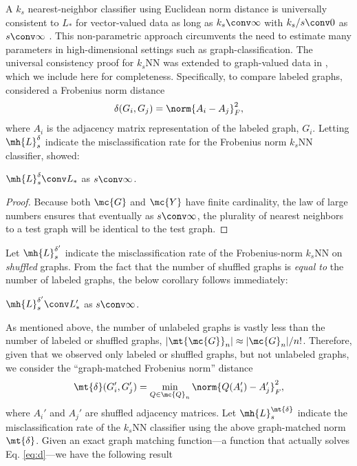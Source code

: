 \documentclass[10pt,journal,cspaper,compsoc]{IEEEtran}
\begin{document}
A $k_s$ nearest-neighbor classifier 
using Euclidean norm distance
is universally consistent to $L_*$ for vector-valued data 
as long as $k_s \conv \infty$ with $k_s/s \conv 0$ as $s \conv \infty$ \cite{Stone1977}. This non-parametric approach circumvents the need to estimate many parameters in high-dimensional settings such as graph-classification. The universal consistency proof for $k_s$NN was extended to graph-valued data in \cite{VP11_super}, which we include here for completeness.   Specifically, to compare labeled graphs, \cite{VP11_super} considered a Frobenius norm distance
\begin{align}
	\delta(G_i,G_j)=\norm{A_i-A_j}_F^2,
\end{align}
where $A_i$ is the adjacency matrix representation of the labeled graph, $G_i$.  Letting $\mh{L}^{\delta}_s$ indicate the misclassification rate for the Frobenius norm $k_s$NN classifier, \cite{VP11_super} showed:
\begin{thm} \label{thm:5}
	$\mh{L}^{\delta}_s \conv L_*$ as $s \conv \infty$.
\end{thm}
\begin{proof}
Because both $\mc{G}$ and $\mc{Y}$ have finite cardinality, the law of large numbers ensures that eventually as $s \conv \infty$, the plurality of nearest neighbors to a test graph will be identical to the test graph. 
\end{proof}
Let $\mh{L}^{\delta'}_s$ indicate the misclassification rate of the Frobenius-norm $k_s$NN on \emph{shuffled} graphs.  From the fact that the number of shuffled graphs is \emph{equal to} the number of labeled graphs,  the below corollary follows immediately:
\begin{coro} \label{cor:1}
	$\mh{L}^{\delta'}_s \conv L_*'$ as $s \conv \infty$.
\end{coro}
As mentioned above, the number of unlabeled graphs is vastly less than the number of labeled or shuffled graphs, $|\mt{\mc{G}}_n| \approx |\mc{G}_n|/n!$.  Therefore, given that we observed only labeled or shuffled graphs, but not unlabeled graphs, we consider the ``graph-matched Frobenius norm'' distance
\begin{align} \label{eq:d}
\mt{\delta}(G_i',G_j')=\min_{Q \in \mc{Q}_n}\norm{Q(A_i')-A_j'}_F^2,	
\end{align}
where $A_i'$ and $A_j'$ are shuffled adjacency matrices.  Let $\mh{L}^{\mt{\delta}}_s$ indicate the misclassification rate of the $k_s$NN classifier using the above graph-matched norm $\mt{\delta}$.  Given an exact graph matching function---a function that actually solves Eq. \eqref{eq:d}---we have the following result
\end{document}
